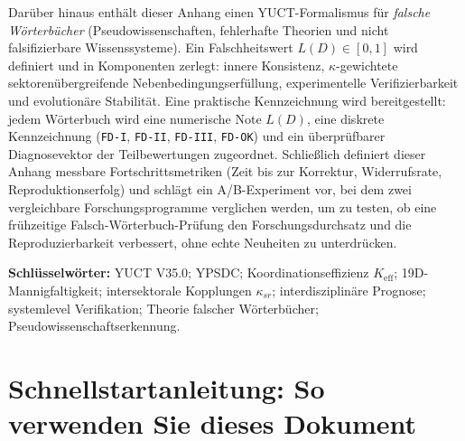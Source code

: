 \documentclass[13pt,a4paper]{article}
\newcommand{\Keff}{K_{\mathrm{eff}}}
\begin{document}
\begin{titlepage}
\begin{center}
\begin{minipage}{0.92\textwidth}
				Darüber hinaus enthält dieser Anhang einen YUCT-Formalismus für \emph{falsche Wörterbücher} (Pseudowissenschaften, fehlerhafte Theorien und nicht falsifizierbare Wissenssysteme). Ein Falschheitswert $L(D)\in[0,1]$ wird definiert und in Komponenten zerlegt: innere Konsistenz, $\kappa$-gewichtete sektorenübergreifende Nebenbedingungserfüllung, experimentelle Verifizierbarkeit und evolutionäre Stabilität. Eine praktische Kennzeichnung wird bereitgestellt: jedem Wörterbuch wird eine numerische Note $L(D)$, eine diskrete Kennzeichnung (\texttt{FD-I}, \texttt{FD-II}, \texttt{FD-III}, \texttt{FD-OK}) und ein überprüfbarer Diagnosevektor der Teilbewertungen zugeordnet. Schließlich definiert dieser Anhang messbare Fortschrittsmetriken (Zeit bis zur Korrektur, Widerrufsrate, Reproduktionserfolg) und schlägt ein A/B-Experiment vor, bei dem zwei vergleichbare Forschungsprogramme verglichen werden, um zu testen, ob eine frühzeitige Falsch-Wörterbuch-Prüfung den Forschungsdurchsatz und die Reproduzierbarkeit verbessert, ohne echte Neuheiten zu unterdrücken.
			\end{minipage}
			
			\vfill
			\small
			\textbf{Schlüsselwörter:} YUCT V35.0; YPSDC; Koordinationseffizienz $\Keff$; 19D-Mannigfaltigkeit; intersektorale Kopplungen $\kappa_{sr}$; interdisziplinäre Prognose; systemlevel Verifikation; Theorie falscher Wörterbücher; Pseudowissenschaftserkennung.
		\end{center}
	\end{titlepage}
	
	\section*{Schnellstartanleitung: So verwenden Sie dieses Dokument}
	
\end{document}
